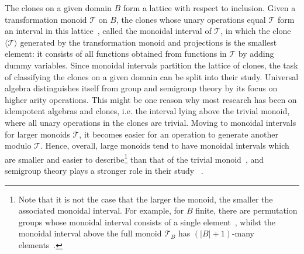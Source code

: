 \documentclass{article}
\newcommand{\ignore}[1]{}
\theoremstyle{remark}
\theoremstyle{definition}
\begin{document}
The clones on a given domain $B$ form a lattice with respect to inclusion. Given a transformation monoid $\mathcal{T}$ on $B$, the clones whose unary operations equal $\mathcal{T}$ form an interval in this lattice~\cite[Proposition 3.1]{szendrei1986clones}, called the monoidal interval of $\mathcal{T}$, in which the clone $\langle \mathcal{T}\rangle$ generated by the transformation monoid and projections is the smallest element: it consists of all functions obtained from functions in $\mathcal{T}$ by adding dummy variables. Since monoidal intervals partition the lattice of clones, the task of classifying the clones on a given domain can be split into their study. Universal algebra distinguishes itself from group and semigroup theory by its focus on higher arity operations. This might be one reason why most research has been on idempotent algebras and clones, i.e. the interval lying above the trivial monoid, where all unary operations in the clones are trivial. Moving to  monoidal intervals for larger monoids $\mathcal{T}$, it becomes easier for an operation to generate another modulo $\mathcal{T}$. Hence, overall, large monoids tend to have monoidal intervals which are smaller and easier to describe\footnote{Note that it is not the case that the larger the monoid, the smaller the associated monoidal interval. For example, for $B$ finite, there are permutation groups whose monoidal interval consists of a single element~\cite{palfy1982contributions, kearnes2001collapsing}, whilst the monoidal interval above the full monoid $\mathcal{T}_B$  has $(|B|+1)$-many elements~\cite{burle1967classes}.} than that of the trivial monoid~\cite{burle1967classes, Haddad_Rosenberg_1994, machida2007minimal, PINSKER200859}, and semigroup theory plays a stronger role in their study ~\cite{krokhin1995monoid, PINSKER200859}.\\

\ignore{
Moving to  monoidal intervals for larger monoids $\mathcal{T}$, one would expect the interval to shrink since the larger the monoid, the easier it is for a given operation to generate another modulo $\mathcal{T}$. The way this works is not straightforward, and semigroup theory plays a stronger role in the picture~\cite{krokhin1995monoid, PINSKER200859}: for $B$ finite there are permutation groups whose monoidal interval consists of a single element~\cite{palfy1982contributions, kearnes2001collapsing}, whilst the monoidal interval above the full monoid $\mathcal{T}_B$  has $(|B|+1)$-many elements~\cite{burle1967classes}. Nevertheless, for large monoids it is often possible to describe their monoidal intervals~\cite{burle1967classes, Haddad_Rosenberg_1994, machida2007minimal, PINSKER200859}.}
\end{document}
